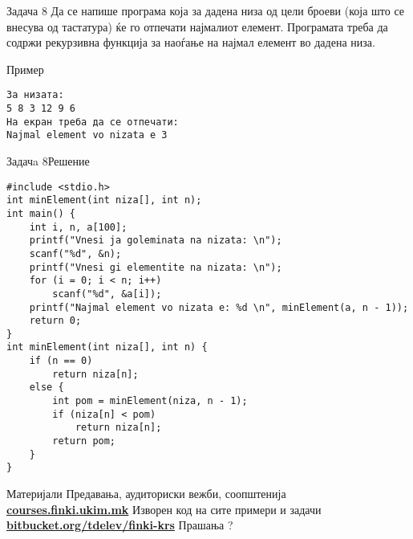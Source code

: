 \begin{frame}[fragile]{Задача 8}
Да се напише програма која за дадена низа од цели броеви (која што се
внесува од тастатура) ќе го отпечати најмалиот елемент. Програмата треба да
содржи рекурзивна функција за наоѓање на најмал елемент во дадена низа.
\begin{exampleblock}{Пример}
\begin{verbatim}
За низата:
5 8 3 12 9 6
На екран треба да се отпечати:
Najmal element vo nizata e 3
\end{verbatim}
\end{exampleblock}
\end{frame}

\begin{frame}[fragile]{Задачa 8}{Решение}
\begin{lstlisting}
#include <stdio.h>
int minElement(int niza[], int n);
int main() {
    int i, n, a[100];
    printf("Vnesi ja goleminata na nizata: \n");
    scanf("%d", &n);
    printf("Vnesi gi elementite na nizata: \n");
    for (i = 0; i < n; i++)
        scanf("%d", &a[i]);
    printf("Najmal element vo nizata e: %d \n", minElement(a, n - 1));
    return 0;
}
int minElement(int niza[], int n) {
    if (n == 0)
        return niza[n];
    else {
        int pom = minElement(niza, n - 1);
        if (niza[n] < pom)
            return niza[n];
        return pom;
    }
}
\end{lstlisting}
\end{frame}

\begin{frame}{Материјали}{}
	Предавања, аудиториски вежби, соопштенија\\
	\href{http://courses.finki.ukim.mk/}{\textbf{courses.finki.ukim.mk}}
	\vfill
	Изворен код на сите примери и задачи\\
	\href{http://bitbucket.org/tdelev/finki-krs/}{\textbf{bitbucket.org/tdelev/finki-krs}}
	\vfill
	{\Huge Прашања ?}
\end{frame}


